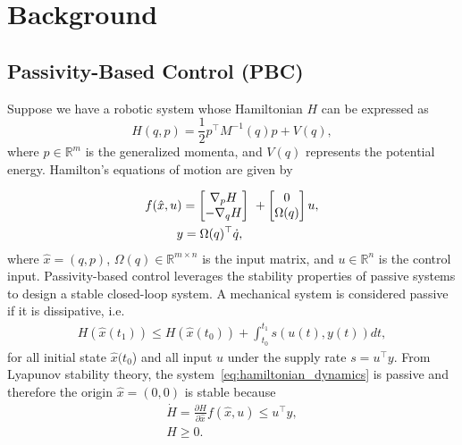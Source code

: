 
\section{Background}

\subsection{Passivity-Based Control (PBC)}
\label{ssec:pbc}

Suppose we have a robotic system whose Hamiltonian $H$ can be expressed as
%
\begin{equation}
    H(q,p) = \frac{1}{2} p^\top M^{-1}(q) p + V(q),
    \label{eq:system_hamiltonian}
\end{equation}
%
where $p \in \mathbb{R}^m$ is the generalized momenta, and $V(q)$ represents the
potential energy. Hamilton's equations of motion are given by

\begin{align}
    \begin{split}  
      f(\hat{x}, u) &= \bmat{\nabla_pH \\ -\nabla_qH}\ + \bmat{0 \\ \Omega(q)}u, \\
      &\hspace{-0.15cm} y = \Omega(q)^\top \dot{q},
    \end{split}
    \label{eq:hamiltonian_dynamics}
\end{align}
\noindent where $\hat{x} = (q, p)$, $\Omega(q) \in \mathbb{R}^{m \times n}$ is
the input matrix, and $u \in \mathbb{R}^{n}$ is the control input.
%
%
Passivity-based control leverages the stability properties of passive systems to
design a stable closed-loop system.
%
A mechanical system is considered passive if it is dissipative, i.e.
\begin{align}
  H(\hat{x}(t_1)) \leq H(\hat{x}(t_0)) + \int_{t_0}^{t_1} s(u(t), y(t)) dt,
\end{align}
\noindent for all initial state $\hat{x}(t_0$) and all input $u$ under the
supply rate $s = u^\top y$.
%
From Lyapunov stability theory, the system~\eqref{eq:hamiltonian_dynamics} is
passive and therefore the origin $\hat{x} = (0, 0)$ is stable because 
\begin{equation*}
  \begin{gathered}
    \dot{H} = \frac{\partial H}{\partial \hat{x}} f(\hat{x}, u) \leq u^\top y, \\
    H \geq 0.
  \end{gathered}
\end{equation*}


